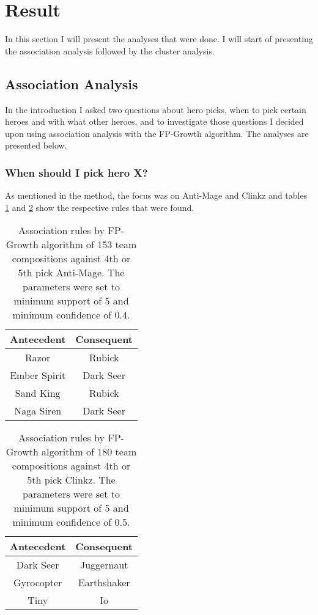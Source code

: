 \documentclass[result.tex]{subfiles}
\begin{document}
\section*{\centering Result}

In this section I will present the analyses that were done. I will start of presenting the association analysis followed by the cluster analysis.

\subsection*{Association Analysis}

In the introduction I asked two questions about hero picks, when to pick certain heroes and with what other heroes, and to investigate those questions I decided upon using association analysis with the FP-Growth algorithm. The analyses are presented below.

\subsubsection*{When should I pick hero X?}

As mentioned in the method, the focus was on Anti-Mage and Clinkz and tables \ref{tab:ass_antimage} and \ref{tab:ass_clinkz} show the respective rules that were found.

\begin{table}[H]
  \centering
  \begin{tabular}{ | c | c | }
    \hline
    Antecedent & Consequent \\ \hline
    Razor & Rubick \\ \hline
    Ember Spirit & Dark Seer \\ \hline
    Sand King & Rubick \\ \hline
    Naga Siren & Dark Seer  \\
    \hline
  \end{tabular}
  \caption{Association rules by FP-Growth algorithm of 153 team compositions against 4th or 5th pick Anti-Mage. The parameters were set to minimum support of 5 and minimum confidence of 0.4.}
  \label{tab:ass_antimage}
\end{table}


\begin{table}[H]
  \centering
  \begin{tabular}{ | c | c | }
    \hline
    Antecedent & Consequent \\ \hline
    Dark Seer & Juggernaut \\ \hline
    Gyrocopter & Earthshaker \\ \hline
    Tiny & Io \\
    \hline
  \end{tabular}
  \caption{Association rules by FP-Growth algorithm of 180 team compositions against 4th or 5th pick Clinkz. The parameters were set to minimum support of 5 and minimum confidence of 0.5.}
  \label{tab:ass_clinkz}
\end{table}
\end{document}
